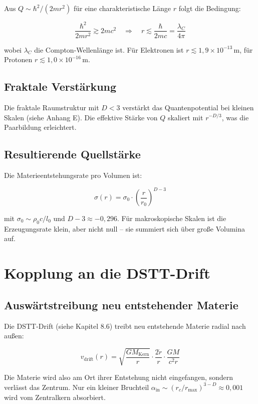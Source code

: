 Aus \( Q \sim \hbar^2/(2m r^2) \) für eine charakteristische Länge \( r \) folgt die Bedingung:

\[
\frac{\hbar^2}{2m r^2} \gtrsim 2mc^2 \quad \Rightarrow \quad 
r \lesssim \frac{\hbar}{2mc} = \frac{\lambda_C}{4\pi}
\]

wobei \( \lambda_C \) die Compton-Wellenlänge ist. Für Elektronen ist 
\( r \lesssim 1,9 \times 10^{-13} \, \text{m} \), für Protonen 
\( r \lesssim 1,0 \times 10^{-16} \, \text{m} \).

\subsection{Fraktale Verstärkung}

Die fraktale Raumstruktur mit \( D < 3 \) verstärkt das Quantenpotential bei kleinen 
Skalen (siehe Anhang E). Die effektive Stärke von \( Q \) skaliert mit \( r^{-D/3} \), 
was die Paarbildung erleichtert.

\subsection{Resultierende Quellstärke}

Die Materieentstehungsrate pro Volumen ist:

\[
\sigma(r) = \sigma_0 \cdot \left( \frac{r}{r_0} \right)^{D-3} \tag{J.10}
\]

mit \( \sigma_0 \sim \rho_0 c / l_0 \) und \( D-3 \approx -0,296 \). Für makroskopische 
Skalen ist die Erzeugungsrate klein, aber nicht null – sie summiert sich über große 
Volumina auf.

\section{Kopplung an die DSTT-Drift}

\subsection{Auswärtstreibung neu entstehender Materie}

Die DSTT-Drift (siehe Kapitel 8.6) treibt neu entstehende Materie radial nach außen:

\[
v_{\text{drift}}(r) = \sqrt{\frac{GM_{\text{Kern}}}{r}} \cdot 
\frac{2\dot{r}}{r} \cdot \frac{GM}{c^2 r} \tag{J.11}
\]

Die Materie wird also am Ort ihrer Entstehung nicht eingefangen, sondern verlässt das 
Zentrum. Nur ein kleiner Bruchteil \( \alpha_{\text{in}} \sim 
(r_c / r_{\text{max}})^{3-D} \approx 0,001 \) wird vom Zentralkern absorbiert.

